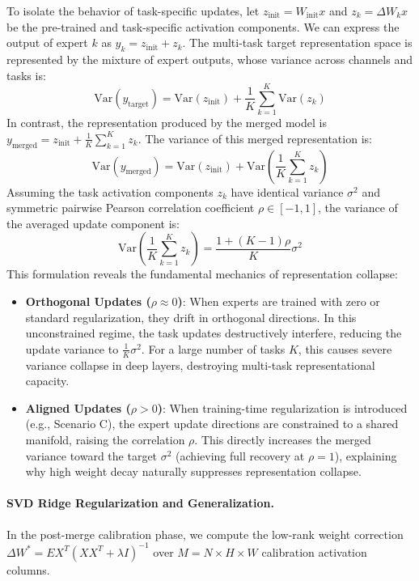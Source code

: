 \documentclass{article}
\theoremstyle{plain}
\theoremstyle{definition}
\theoremstyle{remark}
\begin{document}
To isolate the behavior of task-specific updates, let $z_{\text{init}} = W_{\text{init}} x$ and $z_k = \Delta W_k x$ be the pre-trained and task-specific activation components. We can express the output of expert $k$ as $y_k = z_{\text{init}} + z_k$. The multi-task target representation space is represented by the mixture of expert outputs, whose variance across channels and tasks is:
\begin{equation}
    \text{Var}(y_{\text{target}}) = \text{Var}(z_{\text{init}}) + \frac{1}{K} \sum_{k=1}^K \text{Var}(z_k)
\end{equation}
In contrast, the representation produced by the merged model is $y_{\text{merged}} = z_{\text{init}} + \frac{1}{K} \sum_{k=1}^K z_k$. The variance of this merged representation is:
\begin{equation}
    \text{Var}(y_{\text{merged}}) = \text{Var}(z_{\text{init}}) + \text{Var}\left(\frac{1}{K} \sum_{k=1}^K z_k\right)
\end{equation}
Assuming the task activation components $z_k$ have identical variance $\sigma^2$ and symmetric pairwise Pearson correlation coefficient $\rho \in [-1, 1]$, the variance of the averaged update component is:
\begin{equation}
    \text{Var}\left(\frac{1}{K} \sum_{k=1}^K z_k\right) = \frac{1 + (K - 1)\rho}{K} \sigma^2
\end{equation}
This formulation reveals the fundamental mechanics of representation collapse:
\begin{itemize}
    \item \textbf{Orthogonal Updates ($\rho \approx 0$)}: When experts are trained with zero or standard regularization, they drift in orthogonal directions. In this unconstrained regime, the task updates destructively interfere, reducing the update variance to $\frac{1}{K} \sigma^2$. For a large number of tasks $K$, this causes severe variance collapse in deep layers, destroying multi-task representational capacity.
    \item \textbf{Aligned Updates ($\rho > 0$)}: When training-time regularization is introduced (e.g., Scenario C), the expert update directions are constrained to a shared manifold, raising the correlation $\rho$. This directly increases the merged variance toward the target $\sigma^2$ (achieving full recovery at $\rho = 1$), explaining why high weight decay naturally suppresses representation collapse.
\end{itemize}

\paragraph{SVD Ridge Regularization and Generalization.}
In the post-merge calibration phase, we compute the low-rank weight correction $\Delta W^* = E X^T (X X^T + \lambda I)^{-1}$ over $M = N \times H \times W$ calibration activation columns. 
\end{document}
